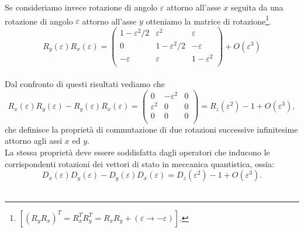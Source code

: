 \documentclass[a4paper,12pt,oneside]{book}
\begin{document}
Se consideriamo invece rotazione di angolo $\varepsilon$ attorno all'asse $x$ seguita da una rotazione di angolo $\varepsilon$ attorno all'asse $y$ otteniamo la matrice di rotazione\footnote{$\displaystyle{\left[\left( R_y R_x\right) ^T = R_x ^T R_y ^T=R_xR_y+(\varepsilon\rightarrow -\varepsilon)\right]}$.}.
	\begin{equation}
		R_y (\varepsilon)R_x (\varepsilon)=
		\begin{pmatrix}
			1-\varepsilon ^2/2 & \varepsilon ^2 & \varepsilon \\
			 0 & 1-\varepsilon ^2/2 & -\varepsilon \\
			-  \varepsilon & \varepsilon & 1-\varepsilon ^2 \\
		\end{pmatrix}
		+ O(\varepsilon ^3)
	\end{equation}\\
	
Dal confronto di questi risultati vediamo che
	\begin{equation}
		R_x (\varepsilon)R_y (\varepsilon)-R_y (\varepsilon)R_x (\varepsilon)=
		\begin{pmatrix}
			0 & - \varepsilon ^2 & 0 \\
			 \varepsilon ^2 & 0 & 0 \\
			0 & 0& 0\\
		\end{pmatrix}
		= R_z(\varepsilon ^2)-1+ O(\varepsilon ^3),
	\end{equation}
che definisce la proprietà di commutazione di due rotazioni successive infinitesime attorno agli assi $x$ ed $y$.\\

La stessa proprietà deve essere soddisfatta dagli operatori che inducono le corrispondenti rotazioni dei vettori di stato in meccanica quantistica, ossia:
	\begin{equation}
		D_x (\varepsilon)D_y (\varepsilon)-D_y (\varepsilon)D_x (\varepsilon)=D_z(\varepsilon ^2)-1+ O(\varepsilon ^3).
	\end{equation}\\
	
\end{document}
